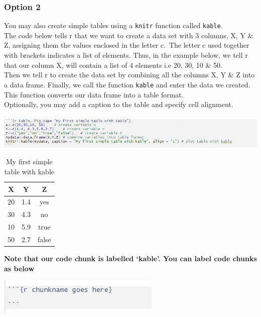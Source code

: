 \documentclass[
]{book}
\let\origfigure\figure
\let\endorigfigure\endfigure
\renewenvironment{figure}[1][2] {
    \expandafter\origfigure\expandafter[H]
} {
    \endorigfigure
}
\begin{document}
\hypertarget{option-2}{%
\subsubsection{Option 2}\label{option-2}}

You may also create simple tables using a \texttt{knitr} function called \texttt{kable}.\\
The code below tells r that we want to create a data set with 3 columns, X, Y \& Z, assigning them the values enclosed in the letter c.~The letter c used together with brackets indicates a list of elements. Thus, in the example below, we tell r that our column X, will contain a list of 4 elements i.e 20, 30, 10 \& 50.\\
Then we tell r to create the data set by combining all the columns X, Y \& Z into a data frame.
Finally, we call the function \texttt{kable} and enter the data we created. This function converts our data frame into a table format.\\
Optionally, you may add a caption to the table and specify cell alignment.

\begin{figure}
\centering
\includegraphics{tutorial_screenshots/kable_table.png}
\caption{kable table}
\end{figure}

\begin{table}[!h]

\caption{\label{tab:kable}My first simple table with kable}
\centering
\begin{tabular}[t]{c|c|c}
\hline
X & Y & Z\\
\hline
20 & 1.4 & yes\\
\hline
30 & 4.3 & no\\
\hline
10 & 5.9 & true\\
\hline
50 & 2.7 & false\\
\hline
\end{tabular}
\end{table}

\textbf{Note that our code chunk is labelled `kable'. You can label code chunks as below}

\begin{figure}
\centering
\includegraphics{tutorial_screenshots/chunk_name.png}
\caption{labled chunk}
\end{figure}
\end{document}
